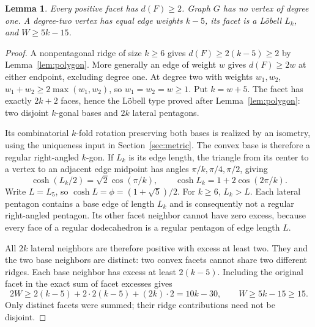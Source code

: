 \documentclass[11pt]{article}
\newtheorem{lemma}[theorem]{Lemma}
\theoremstyle{remark}
\begin{document}
\begin{lemma}\label{lem:small-degree}
Every positive facet has $d(F)\ge2$. Graph $G$ has no vertex of
degree one. A degree-two vertex has equal edge weights $k-5$, its
facet is a L\"obell $L_k$, and $W\ge5k-15$.
\end{lemma}
\begin{proof}
A nonpentagonal ridge of size $k\ge6$ gives
$d(F)\ge2(k-5)\ge2$ by Lemma~\ref{lem:polygon}. More generally
an edge of weight $w$ gives $d(F)\ge2w$ at either endpoint, excluding
degree one. At degree two with weights $w_1,w_2$,
$w_1+w_2\ge2\max(w_1,w_2)$, so $w_1=w_2=w\ge1$.
Put $k=w+5$. The facet has exactly $2k+2$ faces, hence the
L\"obell type proved after Lemma~\ref{lem:polygon}: two disjoint
$k$-gonal bases and $2k$ lateral pentagons.

Its combinatorial $k$-fold rotation preserving both bases is realized
by an isometry, using the uniqueness input in Section~\ref{sec:metric}.
The convex base is therefore a regular right-angled $k$-gon. If $L_k$
is its edge length, the triangle from its center to a vertex to an
adjacent edge midpoint has angles $\pi/k,\pi/4,\pi/2$, giving
\begin{equation}\label{eq:regular-length}
 \cosh(L_k/2)=\sqrt2\cos(\pi/k),\qquad
 \cosh L_k=1+2\cos(2\pi/k).
\end{equation}
Write $L=L_5$, so $\cosh L=\phi=(1+\sqrt5)/2$. For $k\ge6$,
$L_k>L$. Each lateral pentagon contains a base edge of length $L_k$
and is consequently not a regular right-angled pentagon. Its other
facet neighbor cannot have zero excess, because every face of a
regular dodecahedron is a regular pentagon of edge length $L$.

All $2k$ lateral neighbors are therefore positive with excess at least
two. They and the two base neighbors are distinct: two convex facets
cannot share two different ridges. Each base neighbor has excess at
least $2(k-5)$. Including the original facet in the exact sum of
facet excesses gives
\[
 2W\ge2(k-5)+2\cdot2(k-5)+(2k)\cdot2=10k-30,
 \qquad W\ge5k-15\ge15.
\]
Only distinct facets were summed; their ridge contributions need not
be disjoint.
\end{proof}
\end{document}

